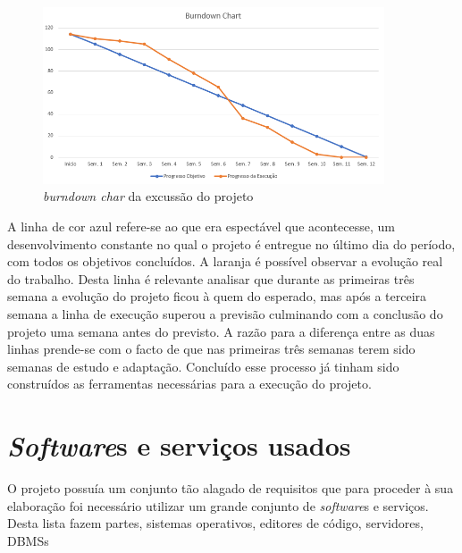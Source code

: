 \begin{figure}[htbp] 
	\begin{center}
		\includegraphics[width=0.90\textwidth,keepaspectratio]{figuras/burndown_chart.png}
		\caption{\textit{burndown char} da excussão do projeto}
		\label{fig:burndown_chart} 
	\end{center}
\end{figure}
\noindent
A linha de cor azul refere-se ao que era espectável que acontecesse, um desenvolvimento constante no qual o projeto é entregue no último dia do período, com todos os objetivos concluídos. A laranja é possível observar a evolução real do trabalho. Desta linha é relevante analisar que durante as primeiras três semana a evolução do projeto ficou à quem do esperado, mas após a terceira semana a linha de execução superou a previsão culminando com a conclusão do projeto uma semana antes do previsto. A razão para a diferença entre as duas linhas prende-se com o facto de que nas primeiras três semanas terem sido semanas de estudo e adaptação. Concluído esse processo já tinham sido construídos as ferramentas necessárias para a execução do projeto.

\section{\textit{Software}s e serviços usados}
O projeto possuía um conjunto tão alagado de requisitos que para proceder à sua elaboração foi necessário utilizar um grande conjunto de \textit{software}s e serviços. Desta lista fazem partes, sistemas operativos, editores de código, servidores, DBMSs

